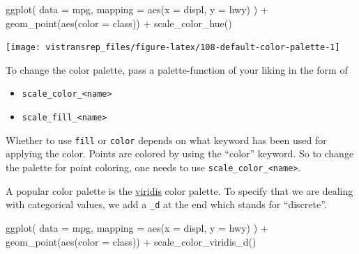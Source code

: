 \documentclass[]{book}
\newenvironment{Shaded}{}{}
\newcommand{\DataTypeTok}[1]{#1}
\newcommand{\KeywordTok}[1]{\textcolor[rgb]{0.00,0.00,1.00}{#1}}
\newcommand{\NormalTok}[1]{#1}
\newcommand{\OperatorTok}[1]{#1}
\newcommand{\StringTok}[1]{\textcolor[rgb]{0.00,0.50,0.50}{#1}}
\providecommand{\tightlist}{%
  \setlength{\itemsep}{0pt}\setlength{\parskip}{0pt}}
\begin{document}
\begin{Shaded}
\begin{Highlighting}[]
\KeywordTok{ggplot}\NormalTok{(}
  \DataTypeTok{data =}\NormalTok{ mpg,}
  \DataTypeTok{mapping =} \KeywordTok{aes}\NormalTok{(}\DataTypeTok{x =}\NormalTok{ displ, }\DataTypeTok{y =}\NormalTok{ hwy)}
\NormalTok{) }\OperatorTok{+}
\StringTok{  }\KeywordTok{geom_point}\NormalTok{(}\KeywordTok{aes}\NormalTok{(}\DataTypeTok{color =}\NormalTok{ class)) }\OperatorTok{+}
\StringTok{  }\KeywordTok{scale_color_hue}\NormalTok{()}
\end{Highlighting}
\end{Shaded}

\begin{flushright}\texttt{[image: vistransrep\_files/figure-latex/108-default-color-palette-1]} \end{flushright}

To change the color palette, pass a palette-function of your liking in the form of

\begin{itemize}
\tightlist
\item
  \texttt{scale\_color\_\textless{}name\textgreater{}}
\item
  \texttt{scale\_fill\_\textless{}name\textgreater{}}
\end{itemize}

Whether to use \texttt{fill} or \texttt{color} depends on what keyword has been used for applying the color.
Points are colored by using the ``color'' keyword.
So to change the palette for point coloring, one needs to use \texttt{scale\_color\_\textless{}name\textgreater{}}.

A popular color palette is the \href{https://cran.r-project.org/web/packages/viridis/vignettes/intro-to-viridis.html\#gallery}{viridis} color palette.
To specify that we are dealing with categorical values, we add a \texttt{\_d} at the end which stands for ``discrete''.

\begin{Shaded}
\begin{Highlighting}[]
\KeywordTok{ggplot}\NormalTok{(}
  \DataTypeTok{data =}\NormalTok{ mpg,}
  \DataTypeTok{mapping =} \KeywordTok{aes}\NormalTok{(}\DataTypeTok{x =}\NormalTok{ displ, }\DataTypeTok{y =}\NormalTok{ hwy)}
\NormalTok{) }\OperatorTok{+}
\StringTok{  }\KeywordTok{geom_point}\NormalTok{(}\KeywordTok{aes}\NormalTok{(}\DataTypeTok{color =}\NormalTok{ class)) }\OperatorTok{+}
\StringTok{  }\KeywordTok{scale_color_viridis_d}\NormalTok{()}
\end{Highlighting}
\end{Shaded}
\end{document}
